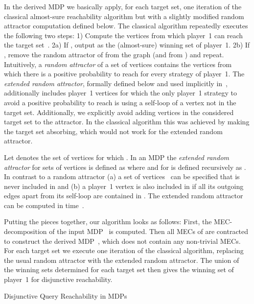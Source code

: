 \documentclass[11pt,letterpaper]{article}
\newcommand{\lu}{\textup{(}}
\newcommand{\ru}{\textup{)}\xspace}
\newcommand{\upbr}[1]{\lu #1\ru}
\begin{document}
{In the derived MDP we basically apply, for each target set,
one iteration of the classical almost-sure reachability algorithm but with a slightly
modified random attractor computation defined below. The classical algorithm
repeatedly executes the following two steps:
1) Compute the vertices  from which player~1 can reach the target set~.
2a) If , output  as the (almost-sure) winning set of player~1.
2b) If , remove the random attractor of  
from the graph (and from ) and repeat.
Intuitively, a \emph{random attractor} of a set of vertices  contains the vertices
from which there is a positive probability to reach  for every strategy of
player~1. The \emph{extended random attractor}, formally defined below
and used implicitly in~\cite{ChatterjeeH14}, additionally 
includes player~1 vertices for which the only player~1 strategy to avoid a 
positive probability to reach  is using a self-loop of a vertex not in 
the target set.
Additionally, we explicitly avoid adding vertices in the considered target set 
to the attractor. In the classical algorithm this was achieved by making the 
target set absorbing, which would not work for the extended random attractor.

\begin{definition}\label{def:extattr}
Let  denotes the set of vertices 
for which .
In an MDP  
the \emph{extended random attractor}  for sets of vertices 
 is defined as  
where  and 
 for  is defined recursively as . In contrast to a random attractor \upbr{a} a set of 
vertices~ can be specified that is never included in  
and \upbr{b} a player~1 vertex is also included in  if all its outgoing 
edges apart from its self-loop are contained in .
The extended random attractor 
can be computed in  time~\cite{Beeri80,Immerman81}.
\end{definition}

Putting the pieces together, our algorithm looks as follows: First, the 
MEC-decomposition of the input MDP~ is computed. Then all MECs of 
are contracted to construct the derived MDP~, which does not contain 
any non-trivial MECs. For each target set we execute one iteration of the classical
algorithm, replacing the usual random attractor with the extended random attractor.
The union of the winning sets determined for each target set then gives the 
winning set of player~1 for disjunctive reachability.

\begin{algorithm}
	\caption{Disjunctive Query Reachability in MDPs}
	\label{alg:drmdp}
	\BlankLine
	\Output
	{
	
}
\end{algorithm}}
\end{document}
